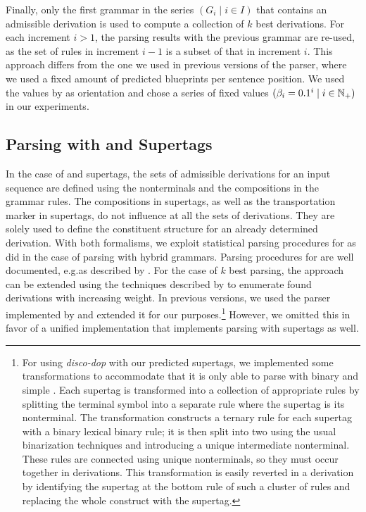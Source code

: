 \documentclass[../../document.tex]{subfiles}
\begin{document}
    Finally, only the first grammar in the series \((G_i \mid i \in I)\) that contains an admissible derivation is used to compute a collection of \(k\) best derivations.
    For each increment \(i > 1\), the parsing results with the previous grammar are re-used, as the set of rules in increment \(i-1\) is a subset of that in increment \(i\).
    This approach differs from the one we used in previous versions of the parser, where we used a fixed amount of predicted blueprints per sentence position. \citep{RupMoe21, Rup22}
    We used the values by \citet{Clark04} as orientation and chose a series of fixed values \((\beta_i = 0.1^i \mid i \in \mathbb{N}_+)\) in our experiments.

    \subsection{Parsing with  and  Supertags}\label{sec:parsing:lcfrs}
    In the case of  and  supertags, the sets of admissible derivations for an input sequence are defined using the nonterminals and the  compositions in the grammar rules.
    The  compositions in  supertags, as well as the transportation marker in  supertags, do not influence at all the sets of derivations.
    They are solely used to define the constituent structure for an already determined derivation.
    With both formalisms, we exploit statistical parsing procedures for  as \citet{Geb20} did in the case of parsing with hybrid grammars.
    Parsing procedures for  are well documented, e.g.\@ as described by \citet[Section 7.1]{Kal10}.
    For the case of \(k\) best parsing, the approach can be extended using the techniques described by \citet{HuaChia05} to enumerate found derivations with increasing weight.
    In previous versions, we used the  parser implemented by \citet{CraSchBod16} and extended it for our purposes.\footnote{
        For using \emph{disco-dop} with our predicted supertags, we implemented some transformations to accommodate that it is only able to parse with binary and simple .
        Each supertag is transformed into a collection of appropriate rules by splitting the terminal symbol into a separate rule where the supertag is its  nonterminal.
        The transformation constructs a ternary rule for each supertag with a binary lexical binary rule; it is then split into two using the usual binarization techniques and introducing a unique intermediate nonterminal.
        These rules are connected using unique nonterminals, so they must occur together in derivations.
        This transformation is easily reverted in a derivation by identifying the supertag at the bottom rule of such a cluster of rules and replacing the whole construct with the supertag.
    }
    However, we omitted this in favor of a unified implementation that implements parsing with  supertags as well.
\end{document}
